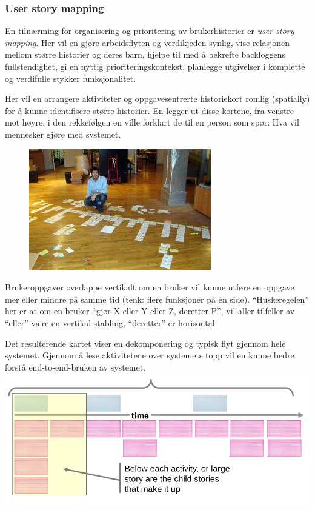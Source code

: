 \subsubsection{User story mapping}

En tilnærming for organisering og prioritering av brukerhistorier er
\emph{user story mapping}. Her vil en gjøre arbeidsflyten og verdikjeden
synlig, vise relasjonen mellom større historier og deres barn, hjelpe
til med å bekrefte backloggens fullstendighet, gi en nyttig
prioriteringskontekst, planlegge utgivelser i komplette og verdifulle
stykker funksjonalitet.

Her vil en arrangere aktiviteter og oppgavesentrerte historiekort romlig
(spatially) for å kunne identifisere større historier. En legger ut
disse kortene, fra venstre mot høyre, i den rekkefølgen en ville
forklart de til en person som spør: Hva vil mennesker gjøre med
systemet.

\begin{figure}[htbp]
\centering
\includegraphics{Forelesning 11/img/large-floor-map.jpg}
\caption{}
\end{figure}

Brukeroppgaver overlappe vertikalt om en bruker vil kunne utføre en
oppgave mer eller mindre på samme tid (tenk: flere funksjoner på én
side). ``Huskeregelen'' her er at om en bruker ``gjør X eller Y eller Z,
deretter P'', vil aller tilfeller av ``eller'' være en vertikal
stabling, ``deretter'' er horisontal.

Det resulterende kartet viser en dekomponering og typisk flyt gjennom
hele systemet. Gjennom å lese aktivitetene over systemets topp vil en
kunne bedre forstå end-to-end-bruken av systemet.
\includegraphics{Forelesning 11/img/2.png}

